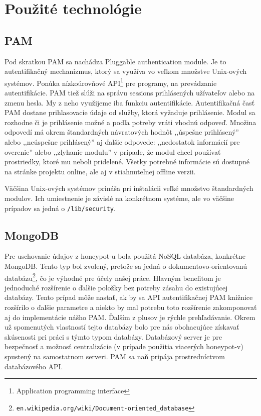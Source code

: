\documentclass[12pt, oneside]{book}
\begin{document}
\section{Použité technológie}

\subsection{PAM}

Pod skratkou PAM sa nachádza Pluggable authentication module.
Je to autentifikačný mechanizmus, ktorý sa využíva vo veľkom množstve Unix-ových systémov.
Ponúka nízkoúrovňové API\footnote{Application programming interface} pre programy, na prevádzanie autentifikácie.
PAM tiež slúži na správu sessions prihlásených užívateľov alebo na zmenu hesla.
My z neho využijeme iba funkciu autentifikácie.
Autentifikačná časť PAM dostane prihlasovacie údaje od služby, ktorá vyžaduje prihlásenie.
Modul sa rozhodne či je prihlásenie možné a podľa potreby vráti vhodnú odpoveď.
Množina odpovedí má okrem štandardných návratových hodnôt ,,úspešne prihlásený'' alebo ,,neúspešne prihlásený'' aj ďalšie odpovede:  ,,nedostatok informácií pre overenie'' alebo ,,zlyhanie modulu'' v prípade, že modul chcel používať prostriedky, ktoré mu neboli pridelené.
Všetky potrebné informácie sú dostupné na stránke projektu\cite{pam} online, ale aj v stiahnuteľnej offline verzii.

Väčšina Unix-ových systémov prináša pri inštalácii veľké množstvo štan\-dard\-ných modulov. Ich umiestnenie je závislé na konkrétnom systéme, ale vo väčšine prípadov sa jedná o \texttt{/lib/security}.

\subsection{MongoDB}

Pre uschovanie údajov z honeypot-u bola použitá NoSQL databáza, konkrétne MongoDB.
Tento typ bol zvolený, pretože sa jedná o dokumentovo-orientovanú databázu\footnote{\texttt{en.wikipedia.org/wiki/Document-oriented\_database}}, čo je výhodné pre účely našej práce.
Hlavným benefitom je jednoduché rozšírenie o ďalšie položky bez potreby zásahu do existujúcej databázy.
Tento prípad môže nastať, ak by sa API autentifikačnej PAM knižnice rozšírilo o ďalšie parametre a niekto by mal potrebu toto rozšírenie zakomponovať aj do implementácie nášho PAM.
Ďalším z plusov je rýchle prehľadávanie.
Okrem už spomenutých vlastností tejto databázy bolo pre nás obohacujúce získavať skúsenosti pri práci s týmto typom databázy.
Databázový server je pre bezpečnosť a možnosť centralizácie (v prípade použitia viacerých honeypot-v) spustený na samostatnom serveri.
PAM sa naň pripája prostredníctvom databázového API.
\end{document}
